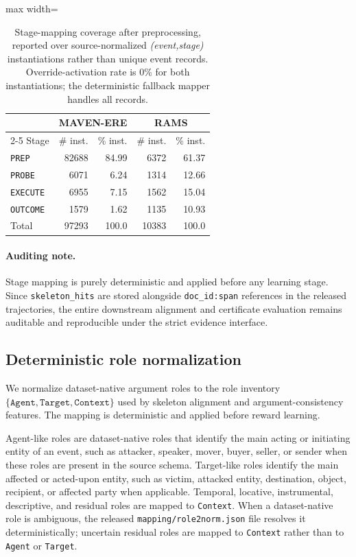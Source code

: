 \documentclass{article}
\begin{document}
\begin{table}[t]
\centering
\caption{Stage-mapping coverage after preprocessing, reported over source-normalized \emph{(event,stage)} instantiations rather than unique event records.
Override-activation rate is $0\%$ for both instantiations; the deterministic fallback mapper handles all records.}
\label{tab:stage_mapping_coverage}
\small
\setlength{\tabcolsep}{6pt}
\begin{adjustbox}{max width=\linewidth}
\begin{tabular}{lrr|rr}
\hline
& \multicolumn{2}{c|}{MAVEN-ERE} & \multicolumn{2}{c}{RAMS} \\
\cline{2-5}
Stage & \# inst. & \% inst. & \# inst. & \% inst. \\
\hline
\texttt{PREP}    & 82688 & 84.99 & 6372 & 61.37 \\
\texttt{PROBE}   & 6071  & 6.24  & 1314 & 12.66 \\
\texttt{EXECUTE} & 6955  & 7.15  & 1562 & 15.04 \\
\texttt{OUTCOME} & 1579  & 1.62  & 1135 & 10.93 \\
\hline
Total            & 97293 & 100.0 & 10383 & 100.0 \\
\hline
\end{tabular}
\end{adjustbox}
\end{table}

\paragraph{Auditing note.}
Stage mapping is purely deterministic and applied before any learning stage.
Since \texttt{skeleton\_hits} are stored alongside \texttt{doc\_id:span} references in the released trajectories,
the entire downstream alignment and certificate evaluation remains auditable and reproducible under the strict evidence interface.

\subsection{Deterministic role normalization}
\label{sec:app_role_mapping}

We normalize dataset-native argument roles to the role inventory
$\{\texttt{Agent},\texttt{Target},\texttt{Context}\}$ used by skeleton alignment and argument-consistency features.
The mapping is deterministic and applied before reward learning.

Agent-like roles are dataset-native roles that identify the main acting or initiating entity of an event, such as attacker, speaker, mover, buyer, seller, or sender when these roles are present in the source schema.
Target-like roles identify the main affected or acted-upon entity, such as victim, attacked entity, destination, object, recipient, or affected party when applicable.
Temporal, locative, instrumental, descriptive, and residual roles are mapped to \texttt{Context}.
When a dataset-native role is ambiguous, the released \texttt{mapping/role2norm.json} file resolves it deterministically; uncertain residual roles are mapped to \texttt{Context} rather than to \texttt{Agent} or \texttt{Target}.
\end{document}
